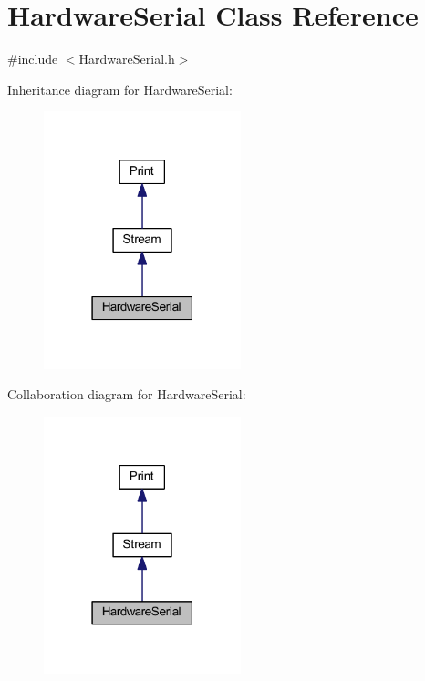 \hypertarget{class_hardware_serial}{}\section{Hardware\+Serial Class Reference}
\label{class_hardware_serial}


{\ttfamily \#include $<$Hardware\+Serial.\+h$>$}



Inheritance diagram for Hardware\+Serial\+:\nopagebreak
\begin{figure}[H]
\begin{center}
\leavevmode
\includegraphics[width=162pt]{class_hardware_serial__inherit__graph}
\end{center}
\end{figure}


Collaboration diagram for Hardware\+Serial\+:\nopagebreak
\begin{figure}[H]
\begin{center}
\leavevmode
\includegraphics[width=162pt]{class_hardware_serial__coll__graph}
\end{center}
\end{figure}
